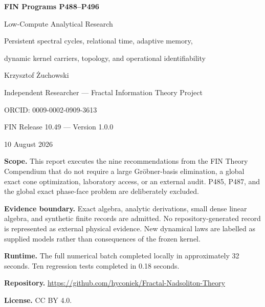 \documentclass[11pt,a4paper]{article}
\theoremstyle{definition}
\theoremstyle{remark}
\begin{document}
\hypersetup{pageanchor=false}

\begin{titlepage}
\centering
\vspace*{16mm}
{\Huge\bfseries FIN Programs P488--P496\par}
\vspace{5mm}
{\Large Low-Compute Analytical Research\par}
\vspace{3mm}
{\large Persistent spectral cycles, relational time, adaptive memory,\par}
{\large dynamic kernel carriers, topology, and operational identifiability\par}
\vspace{15mm}
{\Large Krzysztof Żuchowski\par}
\vspace{2mm}
{\normalsize Independent Researcher --- Fractal Information Theory Project\par}
{\normalsize ORCID: 0009-0002-0909-3613\par}
\vspace{10mm}
{\large FIN Release 10.49 --- Version 1.0.0\par}
{\large 10 August 2026\par}
\vfill
\begin{minipage}{0.90\textwidth}
\small
\textbf{Scope.} This report executes the nine recommendations from the FIN Theory Compendium that do not require a large Gröbner-basis elimination, a global exact cone optimization, laboratory access, or an external audit. P485, P487, and the global exact phase-face problem are deliberately excluded.

\medskip
\textbf{Evidence boundary.} Exact algebra, analytic derivations, small dense linear algebra, and synthetic finite records are admitted. No repository-generated record is represented as external physical evidence. New dynamical laws are labelled as supplied models rather than consequences of the frozen kernel.

\medskip
\textbf{Runtime.} The full numerical batch completed locally in approximately 32 seconds. Ten regression tests completed in 0.18 seconds.

\medskip
\textbf{Repository.} \url{https://github.com/hyconiek/Fractal-Nadsoliton-Theory}

\textbf{License.} CC BY 4.0.
\end{minipage}
\vfill
\end{titlepage}
\hypersetup{pageanchor=true}
\end{document}
